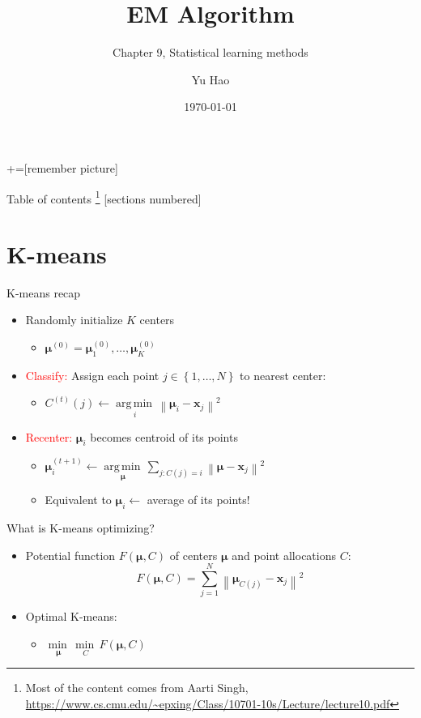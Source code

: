\documentclass[12pt]{beamer}
\title{EM Algorithm}
\subtitle{Chapter 9, Statistical learning methods}
\date{\today}
\author{Yu Hao}
\institute{NaMI, Tongji University}
\newcommand{\norm}[1]{\left\lVert#1\right\rVert}
\newcommand{\argmin}[1]{\underset{#1}{\operatorname*{arg\,min\,}}}
\newcommand{\undermin}[1]{\underset{#1}{\operatorname*{min\,}}}
\begin{document}
+=[remember picture]
\everymath{\displaystyle}

\maketitle

\begin{frame}{Table of contents \footnote{\scriptsize{Most of the content comes from Aarti Singh, \url{https://www.cs.cmu.edu/~epxing/Class/10701-10s/Lecture/lecture10.pdf}}}}
[sections numbered]
\tableofcontents[hideallsubsections]
\end{frame}

\section{K-means}
\begin{frame}{K-means recap}
\begin{itemize}
	\item Randomly initialize $K$ centers 
	\begin{itemize}
		\item $\bm{\mu}^{(0)}=\bm{\mu}_{1}^{(0)},\ldots,\bm{\mu}_{K}^{(0)}$
	\end{itemize}
	\item \textcolor{red}{Classify:} Assign each point $j\in{\left\{ 1,\ldots,N \right\}}$ to nearest center:
	\begin{itemize}
		\item $C^{(t)}(j) \leftarrow \argmin{i} \norm{\bm{\mu}_i-\bm{x}_j}^2$
	\end{itemize}
	\item \textcolor{red}{Recenter:} $\bm{\mu}_i$ becomes centroid of its points
	\begin{itemize}
		\item $\bm{\mu}_{i}^{(t+1)}\leftarrow\argmin{\bm{\mu}}\sum_{j: C(j)=i} \norm{\bm{\mu}-\bm{x}_{j}}^2$
		\item Equivalent to $\bm{\mu}_i \leftarrow$ average of its points!
	\end{itemize}
\end{itemize}
\end{frame}

\begin{frame}{What is K-means optimizing?}
\begin{itemize}
	\item Potential function $F(\bm{\mu},C)$ of centers $\bm{\mu}$ and point allocations $C$:
	\begin{equation} \nonumber
	F(\bm{\mu},C)=\sum_{j=1}^{N} \norm{\bm{\mu}_{C(j)}-\bm{x}_j}^2
	\end{equation}
	\item Optimal K-means:
	\begin{itemize}
		\item $\undermin{\bm{\mu}}\undermin{C}F(\bm{\mu},C)$
	\end{itemize}
\end{itemize}
\end{frame}
\end{document}
